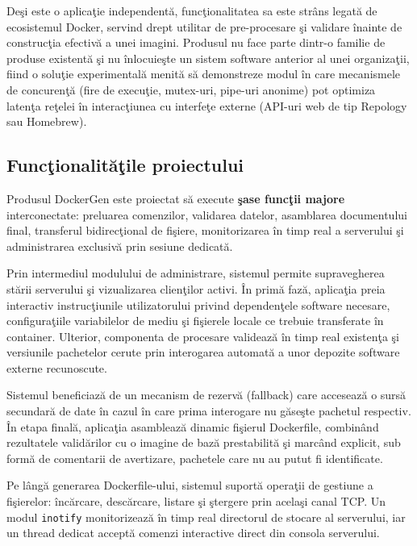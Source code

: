 \documentclass[12pt, a4paper]{article}
\begin{document}
De\c{s}i este o aplica\c{t}ie independent\u{a}, func\c{t}ionalitatea sa este str\^{a}ns legat\u{a} de ecosistemul Docker,
servind drept utilitar de pre-procesare \c{s}i validare \^{i}nainte de construc\c{t}ia efectiv\u{a} a unei imagini.
Produsul nu face parte dintr-o familie de produse existent\u{a} \c{s}i nu \^{i}nlocuie\c{s}te un sistem software anterior
al unei organiza\c{t}ii, fiind o solu\c{t}ie experimental\u{a} menit\u{a} s\u{a} demonstreze modul \^{i}n care mecanismele
de concuren\c{t}\u{a} (fire de execu\c{t}ie, mutex-uri, pipe-uri anonime) pot optimiza laten\c{t}a re\c{t}elei \^{i}n
interac\c{t}iunea cu interfe\c{t}e externe (API-uri web de tip Repology sau Homebrew).

\subsection{Func\c{t}ionalit\u{a}\c{t}ile proiectului}

Produsul DockerGen este proiectat s\u{a} execute \textbf{\c{s}ase func\c{t}ii majore} interconectate: preluarea comenzilor,
validarea datelor, asamblarea documentului final, transferul bidirecţional de fi\c{s}iere, monitorizarea \^{i}n
timp real a serverului \c{s}i administrarea exclusiv\u{a} prin sesiune dedicat\u{a}.

Prin intermediul modulului de administrare, sistemul permite supravegherea st\u{a}rii serverului \c{s}i
vizualizarea clien\c{t}ilor activi. \^{I}n prim\u{a} faz\u{a}, aplica\c{t}ia preia interactiv instruc\c{t}iunile utilizatorului
privind dependen\c{t}ele software necesare, configura\c{t}iile variabilelor de mediu \c{s}i fi\c{s}ierele locale ce trebuie
transferate \^{i}n container. Ulterior, componenta de procesare valideaz\u{a} \^{i}n timp real existen\c{t}a \c{s}i versiunile
pachetelor cerute prin interogarea automat\u{a} a unor depozite software externe recunoscute.

Sistemul beneficiaz\u{a} de un mecanism de rezerv\u{a} (fallback) care acceseaz\u{a} o surs\u{a} secundar\u{a} de date
\^{i}n cazul \^{i}n care prima interogare nu g\u{a}se\c{s}te pachetul respectiv. \^{I}n etapa final\u{a}, aplica\c{t}ia asambleaz\u{a}
dinamic fi\c{s}ierul Dockerfile, combin\^{a}nd rezultatele valid\u{a}rilor cu o imagine de baz\u{a} prestabilit\u{a} \c{s}i
marc\^{a}nd explicit, sub form\u{a} de comentarii de avertizare, pachetele care nu au putut fi identificate.

Pe l\^{a}ng\u{a} generarea Dockerfile-ului, sistemul suport\u{a} opera\c{t}ii de gestiune a fi\c{s}ierelor: \^{i}nc\u{a}rcare,
desc\u{a}rcare, listare \c{s}i \c{s}tergere prin acela\c{s}i canal TCP. Un modul \texttt{inotify} monitorizeaz\u{a} \^{i}n timp real
directorul de stocare al serverului, iar un thread dedicat accept\u{a} comenzi interactive direct din
consola serverului.
\end{document}
